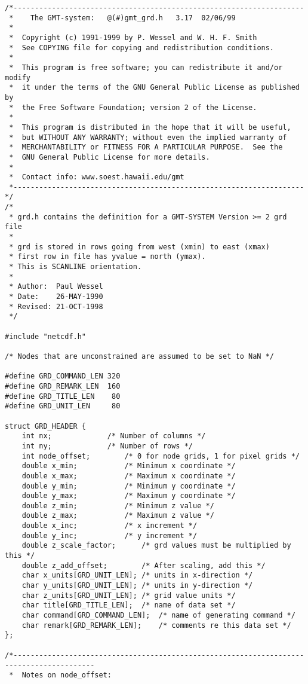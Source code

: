 \lstset{language=[ANSI]C}
\begin{lstlisting}[caption={gmt\_grd.h}]
/*--------------------------------------------------------------------
 *    The GMT-system:	@(#)gmt_grd.h	3.17  02/06/99
 *
 *	Copyright (c) 1991-1999 by P. Wessel and W. H. F. Smith
 *	See COPYING file for copying and redistribution conditions.
 *
 *	This program is free software; you can redistribute it and/or modify
 *	it under the terms of the GNU General Public License as published by
 *	the Free Software Foundation; version 2 of the License.
 *
 *	This program is distributed in the hope that it will be useful,
 *	but WITHOUT ANY WARRANTY; without even the implied warranty of
 *	MERCHANTABILITY or FITNESS FOR A PARTICULAR PURPOSE.  See the
 *	GNU General Public License for more details.
 *
 *	Contact info: www.soest.hawaii.edu/gmt
 *--------------------------------------------------------------------*/
/*
 * grd.h contains the definition for a GMT-SYSTEM Version >= 2 grd file
 *
 * grd is stored in rows going from west (xmin) to east (xmax)
 * first row in file has yvalue = north (ymax).
 * This is SCANLINE orientation.
 *
 * Author:	Paul Wessel
 * Date:	26-MAY-1990
 * Revised:	21-OCT-1998
 */

#include "netcdf.h"

/* Nodes that are unconstrained are assumed to be set to NaN */

#define GRD_COMMAND_LEN	320
#define GRD_REMARK_LEN	160
#define GRD_TITLE_LEN	 80
#define GRD_UNIT_LEN	 80

struct GRD_HEADER {
	int nx;				/* Number of columns */
	int ny;				/* Number of rows */
	int node_offset;		/* 0 for node grids, 1 for pixel grids */
	double x_min;			/* Minimum x coordinate */
	double x_max;			/* Maximum x coordinate */
	double y_min;			/* Minimum y coordinate */
	double y_max;			/* Maximum y coordinate */
	double z_min;			/* Minimum z value */
	double z_max;			/* Maximum z value */
	double x_inc;			/* x increment */
	double y_inc;			/* y increment */
	double z_scale_factor;		/* grd values must be multiplied by this */
	double z_add_offset;		/* After scaling, add this */
	char x_units[GRD_UNIT_LEN];	/* units in x-direction */
	char y_units[GRD_UNIT_LEN];	/* units in y-direction */
	char z_units[GRD_UNIT_LEN];	/* grid value units */
	char title[GRD_TITLE_LEN];	/* name of data set */
	char command[GRD_COMMAND_LEN];	/* name of generating command */
	char remark[GRD_REMARK_LEN];	/* comments re this data set */
};

/*-----------------------------------------------------------------------------------------
 *	Notes on node_offset:


\end{lstlisting}

